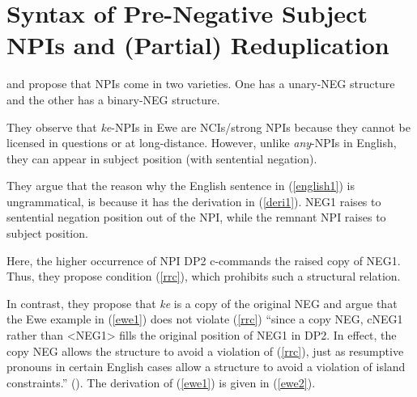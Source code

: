 \documentclass[output=paper,colorlinks,citecolor=brown]{langscibook}
\begin{document}
\section{Syntax of Pre-Negative Subject NPIs and (Partial) Reduplication}

\cite{CollinsPostal2014} and \cite{CollinsEtAl2017} propose that NPIs come in two varieties. One has a unary-NEG structure and the other has a binary-NEG structure.

\ea
{}
\z
\z

They observe that \textit{ke}-NPIs in Ewe are NCIs/strong NPIs because they cannot be licensed in questions or at long-distance. However, unlike \textit{any}-NPIs in English, they can appear in subject position (with sentential negation).

\ea
{}
\z
\z

They argue that the reason why the English sentence in (\ref{english1}) is ungrammatical, is because it has the derivation in (\ref{deri1}). NEG1 raises to sentential negation position out of the NPI, while the remnant NPI raises to subject position.

\z

Here, the higher occurrence of  NPI DP2 c-commands the raised copy of NEG1. Thus, they propose condition (\ref{rrc}), which prohibits such a structural relation.

\z

In contrast, they propose that \textit{ke} is a copy of the original NEG and argue that the Ewe example in (\ref{ewe1}) does not violate (\ref{rrc}) ``since a copy NEG, cNEG1 rather than <NEG1> fills the original position of NEG1 in DP2. In effect, the copy NEG allows the structure to avoid a violation of (\ref{rrc}), just as resumptive pronouns in certain English cases allow a structure to avoid a violation of island constraints.'' (\citealt{CollinsEtAl2017}). The derivation of (\ref{ewe1}) is given in (\ref{ewe2}).
\end{document}
